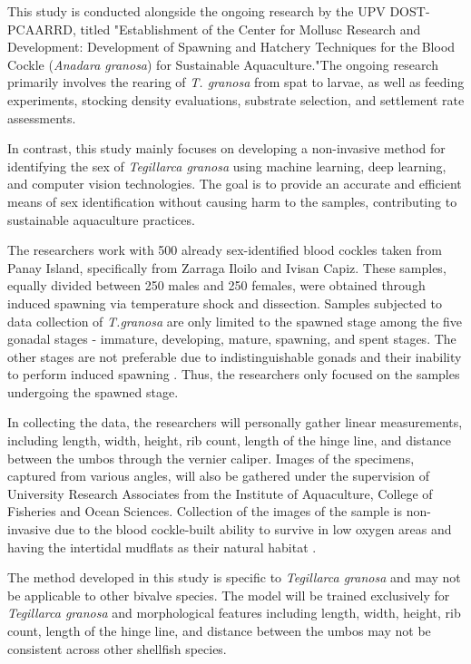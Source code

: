 This study is conducted alongside the ongoing research by the UPV DOST-PCAARRD, titled "Establishment of the Center for Mollusc Research and Development: Development of Spawning and Hatchery Techniques for the Blood Cockle (\textit{Anadara granosa}) for Sustainable Aquaculture."The ongoing research primarily involves the rearing of \textit{T. granosa} from spat to larvae, as well as feeding experiments, stocking density evaluations, substrate selection, and settlement rate assessments.

In contrast, this study mainly focuses on developing a non-invasive method for identifying the sex of \textit{Tegillarca granosa} using machine learning, deep learning, and computer vision technologies. The goal is to provide an accurate and efficient means of sex identification without causing harm to the samples, contributing to sustainable aquaculture practices.

The researchers work with 500 already sex-identified blood cockles taken from Panay Island, specifically from Zarraga Iloilo and Ivisan Capiz. These samples, equally divided between 250 males and 250 females, were obtained through induced spawning via temperature shock and dissection. Samples subjected to data collection of \textit{T.granosa} are only limited to the spawned stage among the five gonadal stages  - immature, developing, mature, spawning, and spent stages. The other stages are not preferable due to indistinguishable gonads and their inability to perform induced spawning \cite{may2021}.  Thus, the researchers only focused on the samples undergoing the spawned stage. 

In collecting the data,  the researchers will personally gather linear measurements, including length, width, height, rib count, length of the hinge line, and distance between the umbos through the vernier caliper. Images of the specimens, captured from various angles, will also be gathered under the supervision of University Research Associates from the Institute of Aquaculture, College of Fisheries and Ocean Sciences. Collection of the images of the sample is non-invasive due to the blood cockle-built ability to survive in low oxygen areas and having the intertidal mudflats as their natural habitat \cite{zhan2022}.

The method developed in this study is specific to \textit{Tegillarca granosa} and may not be applicable to other bivalve species. The model will be trained exclusively for \textit{Tegillarca granosa} and morphological features including length, width, height, rib count, length of the hinge line, and distance between the umbos may not be consistent across other shellfish species. 

